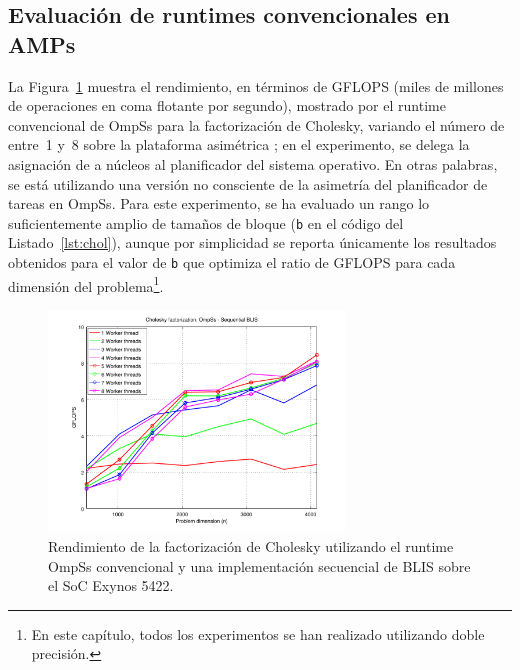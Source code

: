 \subsection{Evaluación de runtimes convencionales en AMPs}
\label{subsec:conv_eval}

La Figura~\ref{fig:ompss_blis_oversubscription} muestra el rendimiento, en
términos de GFLOPS (miles de millones de operaciones en coma flotante por
segundo), mostrado por el runtime convencional de OmpSs para la
factorización de Cholesky, variando el número de \wts entre~1 y~8 sobre la
plataforma asimétrica \odroid; en el experimento, se delega la asignación
de \wts a núcleos al planificador del sistema operativo. En otras palabras,
se está utilizando una versión no consciente de la asimetría del
planificador de tareas en OmpSs. Para este experimento, se ha evaluado un
rango lo suficientemente amplio de tamaños de bloque ({\tt b} en el código
del Listado~\ref{lst:chol}), aunque por simplicidad se reporta únicamente
los resultados obtenidos para el valor de {\tt b} que optimiza el ratio de
GFLOPS para cada dimensión del problema\footnote{En este capítulo, todos
  los experimentos se han realizado utilizando doble precisión.}.

\begin{figure}
\centering
\includegraphics[width=0.70\textwidth]{Plots/Orig_runtime/plot_1to8_th}
\caption{Rendimiento de la factorización de Cholesky utilizando el runtime OmpSs convencional y una implementación secuencial
	de BLIS sobre el SoC Exynos 5422.}
\label{fig:ompss_blis_oversubscription}
\end{figure}


